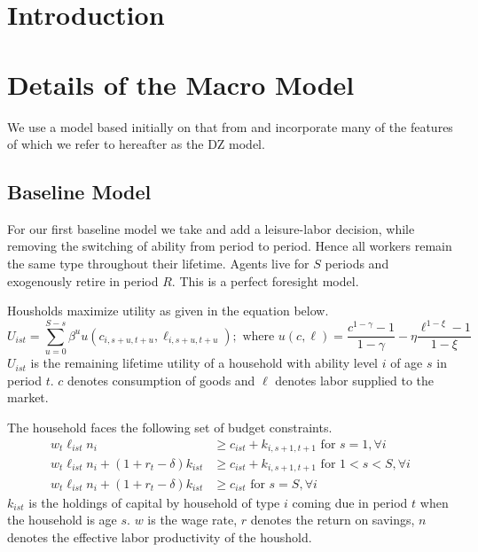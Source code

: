 \documentclass[letterpaper,12pt]{article}
\theoremstyle{definition}
\numberwithin{equation}{section}
\begin{document}
\begin{spacing}{1.5}


\section{Introduction}\label{Sec_Intro}

\section{Details of the Macro Model}\label{Sec_Macro}

  We use a model based initially on that from \citet{EvansPhillips2014} and incorporate many of the features of \citet{ZodrowDiamond:2013} which we refer to hereafter as the DZ model.

  \subsection{Baseline Model}\label{SubSec_Macro_Base}
    For our first baseline model we take \citet{EvansPhillips2014} and add a leisure-labor decision, while removing the switching of ability from period to period.  Hence all workers remain the same type throughout their lifetime.  Agents live for $S$ periods and exogenously retire in period $R$.  This is a perfect foresight model.

    Housholds maximize utility as given in the equation below.
    \begin{equation}\label{Macro_Base_Utility}
    U_{ist} = \sum_{u=0}^{S-s}\beta^u u(c_{i,s+u,t+u},\ell_{i,s+u,t+u});\text{ where }u(c,\ell) = \frac{c^{1-\gamma}-1}{1-\gamma} - \eta \frac{\ell^{1-\xi}-1}{1-\xi}
    \end{equation}
    $U_{ist}$ is the remaining lifetime utility of a household with ability level $i$ of age $s$ in period $t$.  $c$ denotes consumption of goods and $\ell$ denotes labor supplied to the market.

    The household faces the following set of budget constraints.
    \begin{align}
    w_t \ell_{ist} n_i & \ge c_{ist} + k_{i,s+1,t+1} \text{     for } s=1,\forall i \label{Macro_Base_BC1}\\
    w_t \ell_{ist} n_i + (1+r_t-\delta)k_{ist} & \ge c_{ist} + k_{i,s+1,t+1} \text{     for } 1<s<S,\forall i \label{Macro_Base_BC2}\\
    w_t \ell_{ist} n_i + (1+r_t-\delta)k_{ist} & \ge c_{ist} \text{     for } s=S,\forall i \label{Macro_Base_BC3}
    \end{align}
    $k_{ist}$ is the holdings of capital by household of type $i$ coming due in period $t$ when the household is age $s$. $w$ is the wage rate, $r$ denotes the return on savings, $n$ denotes the effective labor productivity of the houshold.


\end{spacing}
\end{document}
